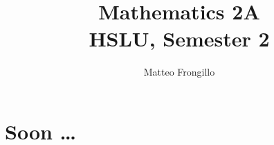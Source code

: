 \documentclass{article}
\title{\textbf{Mathematics 2A \\ HSLU, Semester 2}}
\author{Matteo Frongillo}
\date{}
\begin{document}
\maketitle
\tableofcontents
\pagebreak

\part{Soon \ldots{}}
\end{document}
